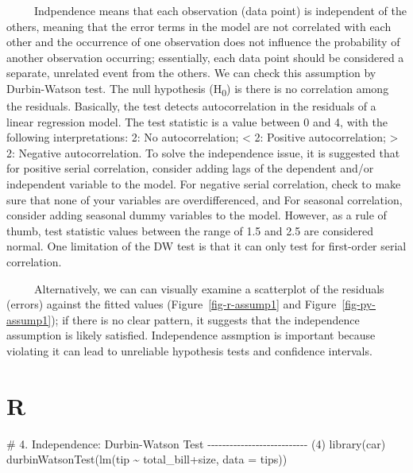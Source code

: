 \documentclass[
  letterpaper,
  DIV=11,
  numbers=noendperiod]{scrreprt}
\newenvironment{Shaded}{\begin{snugshade}}{\end{snugshade}}
\newcommand{\AttributeTok}[1]{\textcolor[rgb]{0.40,0.45,0.13}{#1}}
\newcommand{\CommentTok}[1]{\textcolor[rgb]{0.37,0.37,0.37}{#1}}
\newcommand{\FunctionTok}[1]{\textcolor[rgb]{0.28,0.35,0.67}{#1}}
\newcommand{\NormalTok}[1]{\textcolor[rgb]{0.00,0.23,0.31}{#1}}
\newcommand{\SpecialCharTok}[1]{\textcolor[rgb]{0.37,0.37,0.37}{#1}}
\newcounter{none} %
\begin{document}
~~~~~Indpendence means that each observation (data point) is independent
of the others, meaning that the error terms in the model are not
correlated with each other and the occurrence of one observation does
not influence the probability of another observation occurring;
essentially, each data point should be considered a separate, unrelated
event from the others. We can check this assumption by Durbin-Watson
test. The null hypothesis (H\textsubscript{0}) is there is no
correlation among the residuals. Basically, the test detects
autocorrelation in the residuals of a linear regression model. The test
statistic is a value between 0 and 4, with the following
interpretations: 2: No autocorrelation; \textless{} 2: Positive
autocorrelation; \textgreater{} 2: Negative autocorrelation. To solve
the independence issue, it is suggested that for positive serial
correlation, consider adding lags of the dependent and/or independent
variable to the model. For negative serial correlation, check to make
sure that none of your variables are overdifferenced, and For seasonal
correlation, consider adding seasonal dummy variables to the model.
However, as a rule of thumb, test statistic values between the range of
1.5 and 2.5 are considered normal. One limitation of the DW test is that
it can only test for first-order serial correlation.

~~~~~Alternatively, we can can visually examine a scatterplot of the
residuals (errors) against the fitted values (Figure~\ref{fig-r-assump1}
and Figure~\ref{fig-py-assump1}); if there is no clear pattern, it
suggests that the independence assumption is likely satisfied.
Independence assmption is important because violating it can lead to
unreliable hypothesis tests and confidence intervals.

\section{R}

\begin{Shaded}
\begin{Highlighting}[]
\CommentTok{\# 4. Independence: Durbin{-}Watson Test {-}{-}{-}{-}{-}{-}{-}{-}{-}{-}{-}{-}{-}{-}{-}{-}{-}{-}{-}{-}{-}{-}{-}{-}{-}{-}{-} (4)}
\FunctionTok{library}\NormalTok{(car)}
\FunctionTok{durbinWatsonTest}\NormalTok{(}\FunctionTok{lm}\NormalTok{(tip }\SpecialCharTok{\textasciitilde{}}\NormalTok{ total\_bill}\SpecialCharTok{+}\NormalTok{size, }\AttributeTok{data =}\NormalTok{ tips))}
\end{Highlighting}
\end{Shaded}
\end{document}
